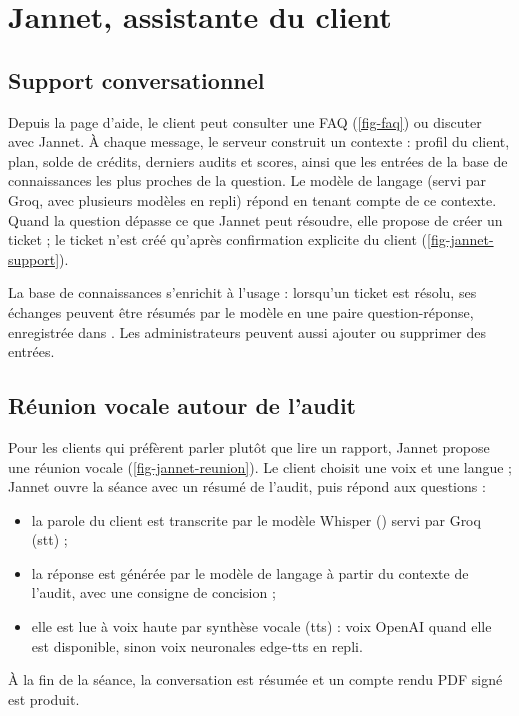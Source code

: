 \section{Jannet, assistante du client}

\subsection{Support conversationnel}
Depuis la page d'aide, le client peut consulter une FAQ (\cref{fig-faq}) ou discuter avec Jannet. À chaque message, le serveur construit un contexte : profil du client, plan, solde de crédits, derniers audits et scores, ainsi que les entrées de la base de connaissances les plus proches de la question. Le modèle de langage (servi par Groq, avec plusieurs modèles en repli) répond en tenant compte de ce contexte. Quand la question dépasse ce que Jannet peut résoudre, elle propose de créer un ticket ; le ticket n'est créé qu'après confirmation explicite du client (\cref{fig-jannet-support}).



La base de connaissances s'enrichit à l'usage : lorsqu'un ticket est résolu, ses échanges peuvent être résumés par le modèle en une paire question-réponse, enregistrée dans . Les administrateurs peuvent aussi ajouter ou supprimer des entrées.

\subsection{Réunion vocale autour de l'audit}
Pour les clients qui préfèrent parler plutôt que lire un rapport, Jannet propose une réunion vocale (\cref{fig-jannet-reunion}). Le client choisit une voix et une langue ; Jannet ouvre la séance avec un résumé de l'audit, puis répond aux questions :
\begin{itemize}
  \item la parole du client est transcrite par le modèle Whisper () servi par Groq (\gls{stt}) ;
  \item la réponse est générée par le modèle de langage à partir du contexte de l'audit, avec une consigne de concision ;
  \item elle est lue à voix haute par synthèse vocale (\gls{tts}) : voix OpenAI quand elle est disponible, sinon voix neuronales edge-tts en repli.
\end{itemize}
À la fin de la séance, la conversation est résumée et un compte rendu PDF signé est produit.

